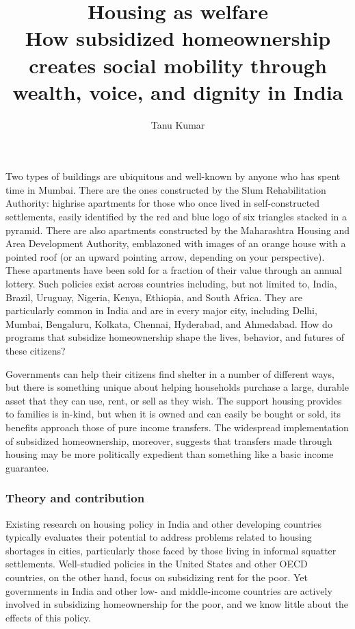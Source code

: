 \documentclass[12pt]{article}
\title{ { Housing as welfare} \\ How subsidized homeownership creates social mobility through wealth, voice, and dignity in India}
\author{Tanu Kumar}
\begin{document}
\maketitle



	Two types of buildings are ubiquitous and well-known by anyone who has spent time in Mumbai. There are the ones constructed by the Slum Rehabilitation Authority: highrise apartments for those who once lived in self-constructed settlements, easily identified by the red and blue logo of six triangles stacked in a pyramid. There are also apartments constructed by the Maharashtra Housing and Area Development Authority, emblazoned with images of an orange house with a pointed roof (or an upward pointing arrow, depending on your perspective).
	These apartments have been sold for a fraction of their value through an annual lottery. Such policies exist across countries including, but not limited to, India, Brazil, Uruguay, Nigeria, Kenya, Ethiopia, and South Africa. They are particularly common in India and are in every major city, including Delhi, Mumbai, Bengaluru, Kolkata, Chennai, Hyderabad, and Ahmedabad.  How do programs that subsidize homeownership shape the lives, behavior, and futures of these citizens?
	

	 	Governments can help their citizens find shelter in a number of different ways, but there is something unique about helping households purchase a large, durable asset that they can use, rent, or sell as they wish. The support housing provides to families is in-kind, but when it is owned and can easily be bought or sold, its benefits approach those of pure income transfers. The widespread implementation of subsidized homeownership, moreover, suggests that transfers made through housing may be more politically expedient than something like a basic income guarantee. 
	 

	


\subsubsection*{Theory and contribution}

Existing research on housing policy in India and other developing countries typically evaluates their potential to address problems related to housing shortages in cities, particularly those faced by those living in informal squatter settlements. Well-studied policies in the United States and other OECD countries, on the other hand, focus on subsidizing rent for the poor. Yet governments in India and other low- and middle-income countries are actively involved in subsidizing homeownership for the poor, and we know little about the effects of this policy. 
   
\end{document}
